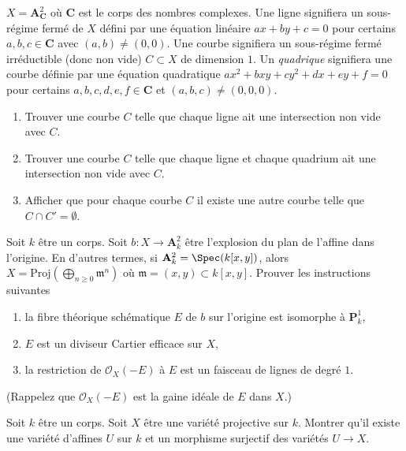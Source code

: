 \begin{exercise}
\label{exercise-miss-curve}
$X = \mathbf{A}^2_\mathbf{C}$ où $\mathbf{C}$ est le corps des nombres complexes. Une ligne
{\it} signifiera un sous-régime fermé de $X$ défini par une équation
linéaire $ax + by + c = 0$ pour certains $a, b, c \in
\mathbf{C}$ avec $(a, b) \not = (0, 0)$. Une courbe {\it}
signifiera un sous-régime fermé irréductible (donc non vide) $C \subset X$ de dimension $1$.
Un {\it quadrique} signifiera une courbe définie
par une équation quadratique $ax^2 + bxy + cy^2
+ dx + ey + f = 0$ pour certains $a, b,
c, d, e, f \in \mathbf{C}$ et $(a, b,
c) \not = (0, 0, 0)$.
\begin{enumerate}
\item Trouver une courbe $C$ telle que chaque ligne ait une intersection non vide avec $C$.
\item Trouver une courbe $C$ telle que chaque ligne et chaque quadrium ait une intersection
non vide avec $C$.
\item Afficher que pour chaque courbe $C$ il existe une autre courbe
telle que $C \cap C' = \emptyset$.
\end{enumerate}
\end{exercise}

\begin{exercise}
\label{exercise-normal-bundle-exceptional-curve}
Soit $k$ être un corps. Soit $b : X \to
\mathbf{A}^2_k$ être l'explosion du plan de l'affine dans l'origine. En
d'autres termes, si $\mathbf{A}^2_k = \Spec(k[x,
y])$, alors $X = \text{Proj}(\bigoplus_{n \geq 0} \mathfrak m^n)$
où $\mathfrak m = (x, y) \subset k[x,
y]$. Prouver les instructions suivantes
\begin{enumerate}
\item la fibre théorique schématique $E$ de $b$ sur
l'origine est isomorphe à $\mathbf{P}^1_k$,
\item $E$ est un diviseur Cartier efficace sur $X$,
\item la restriction de $\mathcal{O}_X(-E)$ à $E$ est
un faisceau de lignes de degré $1$.
\end{enumerate}
(Rappelez que $\mathcal{O}_X(-E)$ est la gaine idéale de $E$ dans $X$.)
\end{exercise}

\begin{exercise}
\label{exercise-surjective-map-affine-variety-projective-variety}
Soit $k$ être un corps. Soit $X$ être une variété projective sur
$k$. Montrer qu'il existe une variété d'affines $U$ sur $k$ et un morphisme
surjectif des variétés $U \to X$.
\end{exercise}

